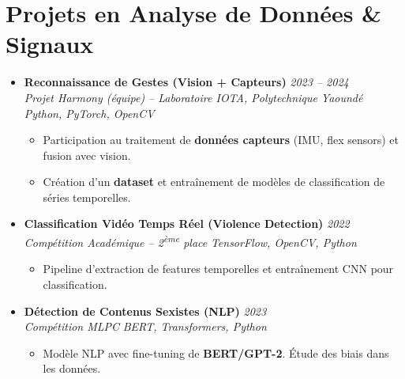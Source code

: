 \documentclass[a4paper,11pt]{article}
\begin{document}
\section{Projets en Analyse de Données \& Signaux}
\begin{itemize}[leftmargin=*, label={-}]

\item \textbf{Reconnaissance de Gestes (Vision + Capteurs)} \hfill \textit{2023 -- 2024} \\
\textit{Projet Harmony (équipe) -- Laboratoire IOTA, Polytechnique Yaoundé} \hfill \textit{Python, PyTorch, OpenCV}
\vspace{-2pt}
    \begin{itemize}[leftmargin=0.4cm, nosep, label=\tiny$\bullet$]
        \item \small{Participation au traitement de \textbf{données capteurs} (IMU, flex sensors) et fusion avec vision.}
        \item \small{Création d'un \textbf{dataset} et entraînement de modèles de classification de séries temporelles.}
    \end{itemize}
\vspace{6pt}

\item \textbf{Classification Vidéo Temps Réel (Violence Detection)} \hfill \textit{2022} \\
\textit{Compétition Académique -- 2\textsuperscript{ème} place} \hfill \textit{TensorFlow, OpenCV, Python}
\vspace{-2pt}
    \begin{itemize}[leftmargin=0.4cm, nosep, label=\tiny$\bullet$]
        \item \small{Pipeline d'extraction de features temporelles et entraînement CNN pour classification.}
    \end{itemize}
\vspace{6pt}

\item \textbf{Détection de Contenus Sexistes (NLP)} \hfill \textit{2023} \\
\textit{Compétition MLPC} \hfill \textit{BERT, Transformers, Python}
\vspace{-2pt}
    \begin{itemize}[leftmargin=0.4cm, nosep, label=\tiny$\bullet$]
        \item \small{Modèle NLP avec fine-tuning de \textbf{BERT/GPT-2}. Étude des biais dans les données.}
    \end{itemize}
\vspace{6pt}

\end{itemize}
\end{document}
